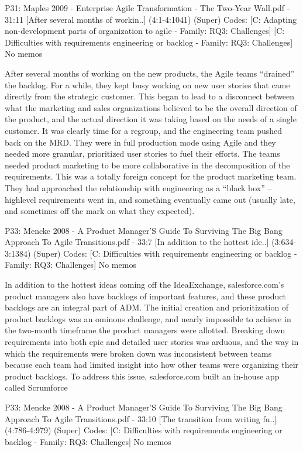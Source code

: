 \documentclass[preprint,authoryear,12pt]{elsarticle}
\begin{document}
P31: Maples 2009 - Enterprise Agile Transformation - The Two-Year Wall.pdf - 31:11 [After several months of workin..]  (4:1-4:1041)   (Super)
Codes:	[C: Adapting non-development parts of organization to agile - Family: RQ3: Challenges] [C: Difficulties with requirements engineering or backlog - Family: RQ3: Challenges] 
No memos

After several months of working on the new 
products, the Agile teams “drained” the backlog.   For 
a while, they kept busy working on new user stories 
that came directly from the strategic customer.  This 
began to lead to a disconnect between what the 
marketing and sales organizations believed to be the 
overall direction of the product, and the actual direction 
it was taking based on the needs of a single customer.   
It was clearly time for a regroup, and the 
engineering team pushed back on the MRD.  They 
were in full production mode using Agile and they 
needed more granular, prioritized user stories to fuel 
their efforts.  The teams needed product marketing to 
be more collaborative in the decomposition of the 
requirements. This was a totally foreign concept for the 
product marketing team.  They had approached the 
relationship with engineering as a “black box” – highlevel requirements went in, and something eventually 
came out (usually late, and sometimes off the mark on 
what they expected).


P33: Mencke 2008 - A Product Manager'S Guide To Surviving The Big Bang Approach To Agile Transitions.pdf - 33:7 [In addition to the hottest ide..]  (3:634-3:1384)   (Super)
Codes:	[C: Difficulties with requirements engineering or backlog - Family: RQ3: Challenges] 
No memos

In addition to the hottest ideas coming off 
the IdeaExchange, salesforce.com’s product 
managers also have backlogs of important 
features, and these product backlogs are an 
integral part of ADM.
The initial creation and prioritization of 
product backlogs was an ominous challenge, and 
nearly impossible to achieve in the two-month 
timeframe the  product managers were allotted. 
Breaking down requirements into both epic and 
detailed user stories was arduous, and the way in 
which the requirements were broken down was
inconsistent between teams because each team 
had limited insight into how other teams were 
organizing their product backlogs. 
To address this issue, salesforce.com built 
an in-house app called  Scrumforce


P33: Mencke 2008 - A Product Manager'S Guide To Surviving The Big Bang Approach To Agile Transitions.pdf - 33:10 [The transition from writing fu..]  (4:786-4:979)   (Super)
Codes:	[C: Difficulties with requirements engineering or backlog - Family: RQ3: Challenges] 
No memos
\end{document}

